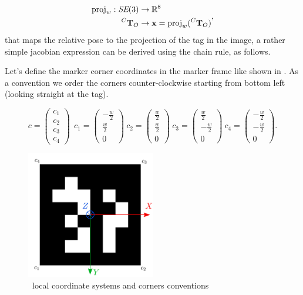 \begin{equation}
    \begin{split}
        \text{proj}_w: \textit{SE}(3) &\rightarrow \mathbb{R}^8 \\
                           \prescript{C}{}{{\bf T}}_{O} &\rightarrow {\bf x} = \text{proj}_w(\prescript{C}{}{{\bf T}}_{O})
    \end{split},
\end{equation}
%
that maps the relative pose to the projection of the tag in the image, a rather simple jacobian expression can be derived using the chain rule, as follows.

Let's define the marker corner coordinates in the marker frame like shown in . As a convention 
\cite{wang2016iros} we order the corners counter-clockwise starting from bottom left (looking straight at the tag). 

\begin{equation}
    c =
    \begin{pmatrix}
    c_1 \\ c_2 \\ c_3 \\ c_4
    \end{pmatrix}
    ~~
    c_1 =  \begin{pmatrix} -\frac{w}{2} \\ \frac{w}{2} \\ 0 \end{pmatrix}
    ~ 
    c_2 =  \begin{pmatrix} \frac{w}{2} \\ \frac{w}{2} \\ 0 \end{pmatrix}
    ~
    c_3 =  \begin{pmatrix} \frac{w}{2} \\ -\frac{w}{2} \\ 0 \end{pmatrix}
    ~
    c_4 =  \begin{pmatrix} -\frac{w}{2} \\ -\frac{w}{2} \\ 0 \end{pmatrix}.
\end{equation}

%
\begin{figure}
    \centering
    \includegraphics[width=0.5\textwidth]{figures/tag12_frame.pdf}
    \caption{\apriltag~local coordinate systems and corners conventions \cite{wang2016iros}}
    \label{fig:tag_coordinate_frame}
\end{figure}

